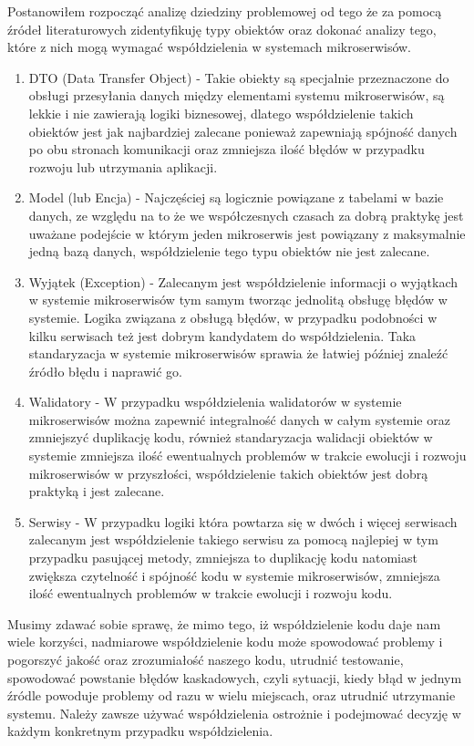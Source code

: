 \documentclass[runningheads,12pt]{llncs}
\begin{document}
Postanowiłem rozpocząć analizę dziedziny problemowej od tego że za pomocą źródeł literaturowych zidentyfikuję typy obiektów oraz dokonać analizy tego, które z nich mogą wymagać współdzielenia w systemach mikroserwisów.

\begin{enumerate}
    \item DTO (Data Transfer Object) - Takie obiekty są specjalnie przeznaczone do obsługi przesyłania danych między elementami systemu mikroserwisów, są lekkie i nie zawierają logiki biznesowej, dlatego współdzielenie takich obiektów jest jak najbardziej zalecane ponieważ zapewniają spójność danych po obu stronach komunikacji oraz zmniejsza ilość błędów w przypadku rozwoju lub utrzymania aplikacji.
    \item Model (lub Encja) - Najczęściej są logicznie powiązane z tabelami w bazie danych, ze względu na to że we współczesnych czasach za dobrą praktykę jest uważane podejście w którym jeden mikroserwis jest powiązany z maksymalnie jedną bazą danych, współdzielenie tego typu obiektów nie jest zalecane.
    \item Wyjątek (Exception) - Zalecanym jest współdzielenie informacji o wyjątkach w systemie mikroserwisów tym samym tworząc jednolitą obsługę błędów w systemie. Logika związana z obsługą błędów, w przypadku podobności w kilku serwisach też jest dobrym kandydatem do współdzielenia. Taka standaryzacja w systemie mikroserwisów sprawia że łatwiej później znaleźć źródło błędu i naprawić go.
    \item Walidatory - W przypadku współdzielenia walidatorów w systemie mikroserwisów można zapewnić integralność danych w całym systemie oraz zmniejszyć duplikację kodu, również standaryzacja walidacji obiektów w systemie zmniejsza ilość ewentualnych problemów w trakcie ewolucji i rozwoju mikroserwisów w przyszłości, współdzielenie takich obiektów jest dobrą praktyką i jest zalecane.
    \item Serwisy - W przypadku logiki która powtarza się w dwóch i więcej serwisach zalecanym jest współdzielenie takiego serwisu za pomocą najlepiej w tym przypadku pasującej metody, zmniejsza to duplikację kodu natomiast zwiększa czytelność i spójność kodu w systemie mikroserwisów, zmniejsza ilość ewentualnych problemów w trakcie ewolucji i rozwoju kodu.
\end{enumerate}

Musimy zdawać sobie sprawę, że mimo tego, iż współdzielenie kodu daje nam wiele korzyści, nadmiarowe współdzielenie kodu może spowodować problemy i pogorszyć jakość oraz zrozumiałość naszego kodu, utrudnić testowanie, spowodować powstanie błędów kaskadowych, czyli sytuacji, kiedy błąd w jednym źródle powoduje problemy od razu w wielu miejscach, oraz utrudnić utrzymanie systemu. Należy zawsze używać współdzielenia ostrożnie i podejmować decyzję w każdym konkretnym przypadku współdzielenia.
\end{document}
